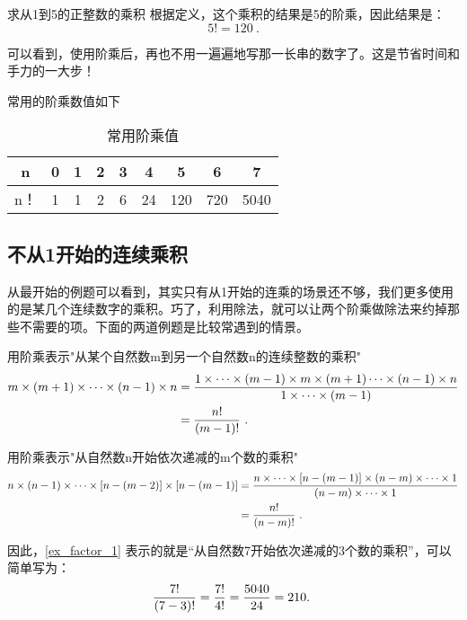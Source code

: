\begin{example}{求从1到5的正整数的乘积}
根据定义，这个乘积的结果是5的阶乘，因此结果是：
$$5! = 120~.$$
\end{example}

可以看到，使用阶乘后，再也不用一遍遍地写那一长串的数字了。这是节省时间和手力的一大步！

常用的阶乘数值如下\begin{table}[ht]
\centering
\caption{常用阶乘值}\label{tab_factor1}
\begin{tabular}{|c|c|c|c|c|c|c|c|c|}
\hline
n & 0 & 1 & 2 & 3 & 4 & 5 & 6 & 7\\
\hline
n！ & 1 & 1 & 2 & 6 & 24 & 120 & 720 & 5040\\
\hline
\end{tabular}
\end{table}

\subsection{不从1开始的连续乘积}

从最开始的例题可以看到，其实只有从1开始的连乘的场景还不够，我们更多使用的是某几个连续数字的乘积。巧了，利用除法，就可以让两个阶乘做除法来约掉那些不需要的项。下面的两道例题是比较常遇到的情景。

\begin{example}{用阶乘表示"从某个自然数m到另一个自然数n的连续整数的乘积"}
\begin{align*}
m\times(m+1)\times\cdots \times(n-1)\times n&={1\times\cdots \times(m-1)\times m\times(m+1)\cdots \times(n-1)\times n\over 1\times\cdots \times(m-1)}\\
&={n!\over (m-1)!}~.
\end{align*}
\end{example}

\begin{example}{用阶乘表示"从自然数n开始依次递减的m个数的乘积"}
\begin{align*}
n\times(n-1)\times\cdots \times[n-(m-2)]\times [n-(m-1)]&={n\times\cdots \times [n-(m-1)]\times(n-m)\times\cdots\times1\over (n-m)\times\cdots \times1}\\
&={n!\over (n-m)!}~.
\end{align*}
\end{example}

因此，\autoref{ex_factor_1} 表示的就是“从自然数7开始依次递减的3个数的乘积”，可以简单写为：
$${7!\over (7-3)!}={7!\over 4!}={5040\over 24}=210.~$$

